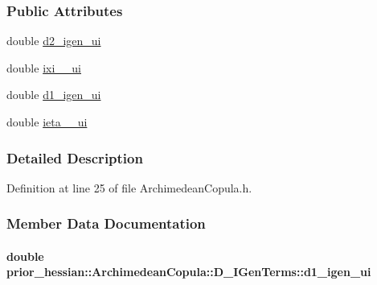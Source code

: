 \subsubsection*{Public Attributes}
\begin{DoxyCompactItemize}
\item 
double \hyperlink{structprior__hessian_1_1ArchimedeanCopula_1_1D2__IGenTerms_ad4db6ce61ba4b3f0c2e38a518d775b0e}{d2\+\_\+igen\+\_\+ui}
\item 
double \hyperlink{structprior__hessian_1_1ArchimedeanCopula_1_1D2__IGenTerms_a50c3840a4d177d78273e18bc242f119f}{ixi\+\_\+\_\+ui}
\item 
double \hyperlink{structprior__hessian_1_1ArchimedeanCopula_1_1D__IGenTerms_a9a54c88cceb06c4b58875d06d355201f}{d1\+\_\+igen\+\_\+ui}
\item 
double \hyperlink{structprior__hessian_1_1ArchimedeanCopula_1_1D__IGenTerms_a2ddab28b1ec16797477b79c5705d811a}{ieta\+\_\+\_\+ui}
\end{DoxyCompactItemize}


\subsubsection{Detailed Description}


Definition at line 25 of file Archimedean\+Copula.\+h.



\subsubsection{Member Data Documentation}
\paragraph[{\texorpdfstring{d1\+\_\+igen\+\_\+ui}{d1_igen_ui}}]{\setlength{\rightskip}{0pt plus 5cm}double prior\+\_\+hessian\+::\+Archimedean\+Copula\+::\+D\+\_\+\+I\+Gen\+Terms\+::d1\+\_\+igen\+\_\+ui\hspace{0.3cm}{\ttfamily [inherited]}}\hypertarget{structprior__hessian_1_1ArchimedeanCopula_1_1D__IGenTerms_a9a54c88cceb06c4b58875d06d355201f}{}\label{structprior__hessian_1_1ArchimedeanCopula_1_1D__IGenTerms_a9a54c88cceb06c4b58875d06d355201f}


